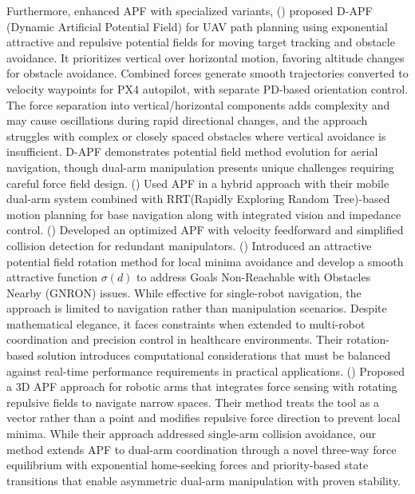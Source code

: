 \documentclass[utf8]{FrontiersinHarvard}
\begin{document}
Furthermore, enhanced APF with specialized variants, (\citet{D-APF}) proposed D-APF (Dynamic Artificial Potential Field) for UAV path planning using exponential attractive and repulsive potential fields for moving target tracking and obstacle avoidance. It prioritizes vertical over horizontal motion, favoring altitude changes for obstacle avoidance. Combined forces generate smooth trajectories converted to velocity waypoints for PX4 autopilot, with separate PD-based orientation control. The force separation into vertical/horizontal components adds complexity and may cause oscillations during rapid directional changes, and the approach struggles with complex or closely spaced obstacles where vertical avoidance is insufficient. D-APF demonstrates potential field method evolution for aerial navigation, though dual-arm manipulation presents unique challenges requiring careful force field design. (\citet{1}) Used APF in a hybrid approach with their mobile dual-arm system combined with RRT(Rapidly Exploring Random Tree)-based motion planning for base navigation along with integrated vision and impedance control. (\citet{2}) Developed an optimized APF with velocity feedforward and simplified collision detection for redundant manipulators. (\citet{Health_robot, health_robot1}) Introduced an attractive potential field rotation method for local minima avoidance and develop a smooth attractive function $\sigma(d)$ to address Goals Non-Reachable with Obstacles Nearby (GNRON) issues. While effective for single-robot navigation, the approach is limited to navigation rather than manipulation scenarios. Despite mathematical elegance, it faces constraints when extended to multi-robot coordination and precision control in healthcare environments. Their rotation-based solution introduces computational considerations that must be balanced against real-time performance requirements in practical applications. (\citet{LIN2025110127}) Proposed a 3D APF approach for robotic arms that integrates force sensing with rotating repulsive fields to navigate narrow spaces. Their method treats the tool as a vector rather than a point and modifies repulsive force direction to prevent local minima. While their approach addressed single-arm collision avoidance, our method extends APF to dual-arm coordination through a novel three-way force equilibrium with exponential home-seeking forces and priority-based state transitions that enable asymmetric dual-arm manipulation with proven stability.
\end{document}
